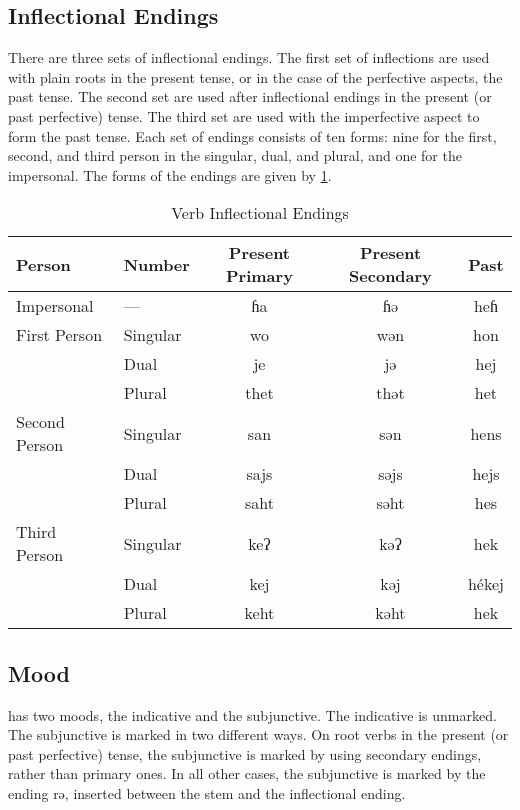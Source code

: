 \subsection{Inflectional Endings}
There are three sets of inflectional endings. The first set of inflections are
used with plain roots in the present tense, or in the case of the perfective
aspects, the past tense. The second set are used after inflectional endings in
the present (or past perfective) tense. The third set are used with the
imperfective aspect to form the past tense. Each set of endings consists of ten
forms: nine for the first, second, and third person in the singular, dual, and
plural, and one for the impersonal. The forms of the endings are given by
\cref{tab:verb inflectional endings}.

\begin{table}[h]
\centering
\caption{Verb Inflectional Endings}
\label{tab:verb inflectional endings}
\begin{tabular}{ll*{3}{>{\ll}c}}
    \toprule
    Person & Number & \rm \parbox{2cm}{\centering Present Primary} & \rm
    \parbox{2cm}{\centering Present Secondary} & \rm Past \\ \midrule
    Impersonal    & —        & ɦa   & ɦə   & heɦ   \\ \midrule
    First Person  & Singular & wo   & wən  & hon   \\
                  & Dual     & je   & jə   & hej   \\
                  & Plural   & thet & thət & het   \\ \midrule
    Second Person & Singular & san  & sən  & hens  \\
                  & Dual     & sajs & səjs & hejs  \\
                  & Plural   & saht & səht & hes   \\ \midrule
    Third Person  & Singular & keʔ  & kəʔ  & hek   \\
                  & Dual     & kej  & kəj  & hékej \\
                  & Plural   & keht & kəht & hek   \\
    \bottomrule
\end{tabular}
\end{table}

\subsection{Mood}
\Langname{} has two moods, the indicative and the subjunctive. The indicative
is unmarked. The subjunctive is marked in two different ways. On root verbs in
the present (or past perfective) tense, the subjunctive is marked by using
secondary endings, rather than primary ones. In all other cases, the
subjunctive is marked by the ending {\ll rə}, inserted between the stem and the
inflectional ending.

